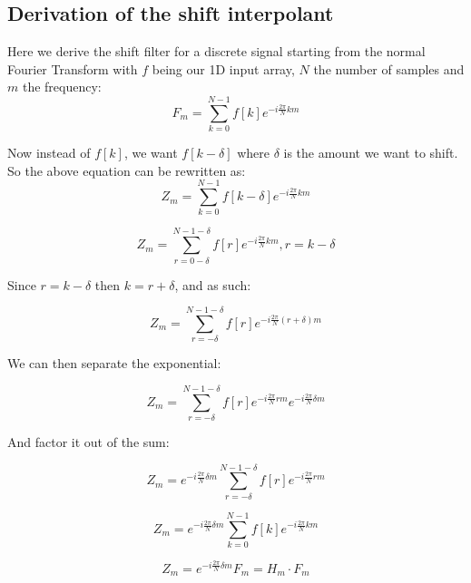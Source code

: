 \documentclass[]{usiinfbachelorproject}
\begin{document}
	
	\subsection{Derivation of the shift interpolant}
	Here we derive the shift filter for a discrete signal starting from the normal Fourier Transform with $f$ being our 1D input array, $N$ the number of samples and $m$ the frequency:
	\begin{equation*}
		F_m = \displaystyle\sum_{k=0}^{N-1}f[k]e^{-i \frac{2\pi}{N} km}
	\end{equation*}
	
	Now instead of $f[k]$, we want $f[k - \delta]$ where $\delta$ is the amount we want to shift.
	So the above equation can be rewritten as:
	\begin{equation*}
		Z_m = \displaystyle\sum_{k=0}^{N-1}f[k - \delta]e^{-i \frac{2\pi}{N} km}
	\end{equation*}
	
	\begin{equation*}
		Z_m = \displaystyle\sum_{r = 0 - \delta}^{N-1-\delta}f[r]e^{-i \frac{2\pi}{N} km}, r = k - \delta 
	\end{equation*}
	
	Since $r = k - \delta$ then $ k = r + \delta$, and as such:
	
	\begin{equation*}
		Z_m = \displaystyle\sum_{r= -\delta}^{N-1 - \delta}f[r]e^{-i \frac{2\pi}{N} (r + \delta)m}
	\end{equation*}
	
	We can then separate the exponential:
	
	\begin{equation*}
		Z_m = \displaystyle\sum_{r= -\delta}^{N-1 - \delta}f[r]e^{-i \frac{2\pi}{N} rm}e^{-i \frac{2\pi}{N}  \delta m}
	\end{equation*}
	
	And factor it out of the sum:
	
	\begin{equation*}
		Z_m = e^{-i \frac{2\pi}{N}  \delta m} \displaystyle\sum_{r= -\delta}^{N-1 - \delta}f[r]e^{-i \frac{2\pi}{N} rm}
	\end{equation*}
	
	\begin{equation*}
		Z_m = e^{-i \frac{2\pi}{N}  \delta m} \displaystyle\sum_{k=0}^{N-1}f[k]e^{-i \frac{2\pi}{N} km}
	\end{equation*}
	
	\begin{equation}
		Z_m = e^{-i \frac{2\pi}{N}  \delta m} F_m = H_m \cdot F_m \label{shift_equation}
	\end{equation}
	
\end{document}
